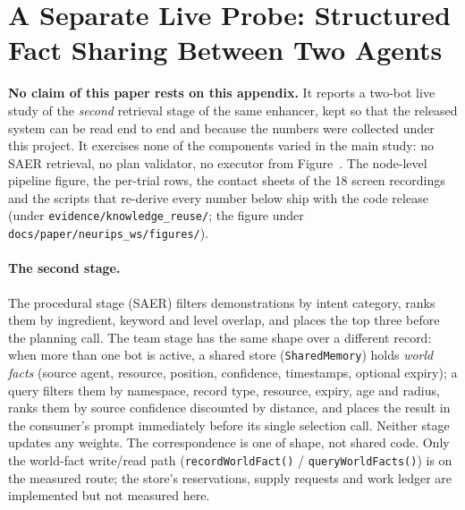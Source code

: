 \documentclass[letterpaper]{article} %
\newcommand{\bodyref}[1]{\getrefnumber{#1}}
\begin{document}
\section{A Separate Live Probe: Structured Fact Sharing Between Two Agents}
\label{sec:multiagent}
\label{app:crossagent}
\label{app:multiagent}
\label{app:twostage}
\label{app:two_stages}
\label{app:implicit}
\label{app:sharedmemory}

\noindent\textbf{No claim of this paper rests on this appendix.}  It reports a
two-bot live study of the \emph{second} retrieval stage of the same enhancer,
kept so that the released system can be read end to end and because the
numbers were collected under this project.  It exercises none of the
components varied in the main study: no SAER retrieval, no plan validator, no
executor from Figure~\bodyref{fig:pipeline}.  The node-level pipeline figure, the
per-trial rows, the contact sheets of the 18 screen recordings and the scripts
that re-derive every number below ship with the code release (under
\texttt{evidence/\allowbreak knowledge\_reuse/}; the figure under
\texttt{docs/\allowbreak paper/\allowbreak neurips\_ws/\allowbreak figures/}).

\paragraph{The second stage.}  The procedural stage (SAER) filters
demonstrations by intent category, ranks them by ingredient, keyword and level
overlap, and places the top three before the planning call.  The team stage
has the same shape over a different record: when more than one bot is active,
a shared store (\texttt{SharedMemory}) holds \emph{world facts} (source agent,
resource, position, confidence, timestamps, optional expiry); a query filters
them by namespace, record type, resource, expiry, age and radius, ranks them by
source confidence discounted by distance, and places the result in the
consumer's prompt immediately before its single selection call.  Neither stage
updates any weights.  The correspondence is one of shape, not shared code.
Only the world-fact write/read path (\texttt{recordWorldFact()} /
\texttt{queryWorldFacts()}) is on the measured route; the store's reservations,
supply requests and work ledger are implemented but not measured here.
\end{document}

